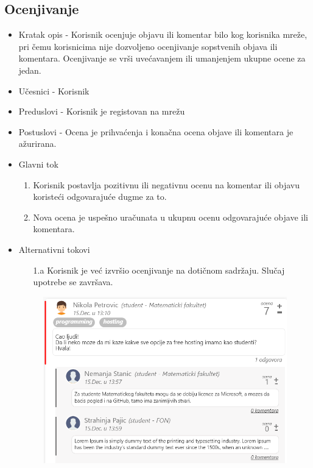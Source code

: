 \subsection{Ocenjivanje}
\begin{itemize}
	\item Kratak opis - Korisnik ocenjuje objavu ili komentar bilo kog korisnika mreže, pri čemu korisnicima nije dozvoljeno ocenjivanje sopstvenih objava ili komentara. Ocenjivanje se vrši uvećavanjem ili umanjenjem ukupne ocene za jedan.
	\item Učesnici - Korisnik
	\item Preduslovi - Korisnik je registovan na mrežu
	\item Postuslovi - Ocena je prihvaćenja i konačna ocena objave ili komentara je ažurirana.
	\item Glavni tok
	\begin{enumerate}
		\item Korisnik postavlja pozitivnu ili negativnu ocenu na komentar ili objavu koristeći odgovarajuće dugme za to.
		\item Nova ocena je uspešno uračunata u ukupnu ocenu odgovarajuće objave ili komentara.
	\end{enumerate}
	\item Alternativni tokovi
    \begin{itemize}
		\item[1.a] Korisnik je već izvršio ocenjivanje na dotičnom sadržaju. Slučaj upotrebe se završava.
	\end{itemize}
\begin{figure}[h!]
		\centerline{\includegraphics[width=\textwidth]{slike/ocenjivanje.png}}
\end{figure}
\end{itemize}

